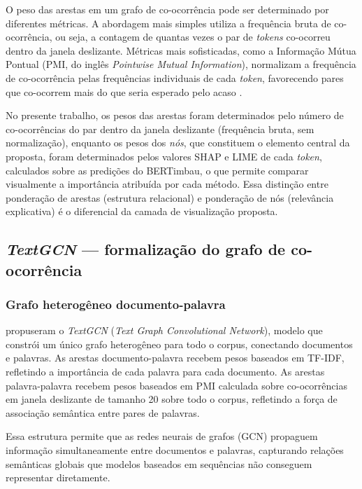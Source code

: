 \documentclass[
    12pt,                %
    openright,           %
    oneside,             %
    a4paper,             %
    english,             %
    brazil               %
]{abntex2}
\begin{document}
O peso das arestas em um grafo de co-ocorrência pode ser determinado por diferentes métricas. A abordagem mais simples utiliza a frequência bruta de co-ocorrência, ou seja, a contagem de quantas vezes o par de \textit{tokens} co-ocorreu dentro da janela deslizante. Métricas mais sofisticadas, como a Informação Mútua Pontual (PMI, do inglês \textit{Pointwise Mutual Information}), normalizam a frequência de co-ocorrência pelas frequências individuais de cada \textit{token}, favorecendo pares que co-ocorrem mais do que seria esperado pelo acaso \cite{yao2019}.

No presente trabalho, os pesos das arestas foram determinados pelo número de co-ocorrências do par dentro da janela deslizante (frequência bruta, sem normalização), enquanto os pesos dos \textit{nós}, que constituem o elemento central da proposta, foram determinados pelos valores SHAP e LIME de cada \textit{token}, calculados sobre as predições do BERTimbau, o que permite comparar visualmente a importância atribuída por cada método. Essa distinção entre ponderação de arestas (estrutura relacional) e ponderação de nós (relevância explicativa) é o diferencial da camada de visualização proposta.

\subsection{\textit{TextGCN} — formalização do grafo de co-ocorrência}
\label{subsec:textgcn}

\subsubsection{Grafo heterogêneo documento-palavra}
\label{subsubsec:textgcn_grafo}

 propuseram o \textit{TextGCN} (\textit{Text Graph Convolutional Network}), modelo que constrói um único grafo heterogêneo para todo o corpus, conectando documentos e palavras. As arestas documento-palavra recebem pesos baseados em TF-IDF, refletindo a importância de cada palavra para cada documento. As arestas palavra-palavra recebem pesos baseados em PMI calculada sobre co-ocorrências em janela deslizante de tamanho 20 sobre todo o corpus, refletindo a força de associação semântica entre pares de palavras.

Essa estrutura permite que as redes neurais de grafos (GCN) propaguem informação simultaneamente entre documentos e palavras, capturando relações semânticas globais que modelos baseados em sequências não conseguem representar diretamente.
\end{document}
